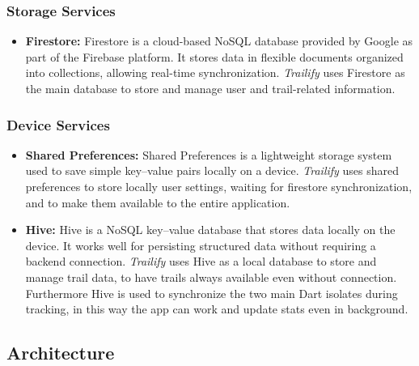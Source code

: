 \documentclass[12pt]{article}
\begin{document}
    \subsubsection{Storage Services}
    \begin{itemize}
        \item \textbf{Firestore:} Firestore is a cloud-based NoSQL database provided by Google as part of the Firebase platform. It stores data in flexible documents organized into collections, allowing real-time synchronization. \textit{Trailify} uses Firestore as the main database to store and manage user and trail-related information.
    \end{itemize}

    \subsubsection{Device Services}
    \begin{itemize}
        \item \textbf{Shared Preferences:} Shared Preferences is a lightweight storage system used to save simple key–value pairs locally on a device. \textit{Trailify} uses shared preferences to store locally user settings, waiting for firestore synchronization, and to make them available to the entire application.
        \item \textbf{Hive:} Hive is a NoSQL key–value database that stores data locally on the device. It works well for persisting structured data without requiring a backend connection. \textit{Trailify} uses Hive as a local database to store and manage trail data, to have trails always available even without connection. Furthermore Hive is used to synchronize the two main Dart isolates during tracking, in this way the app can work and update stats even in background.
    \end{itemize}

\subsection{Architecture}
\end{document}
